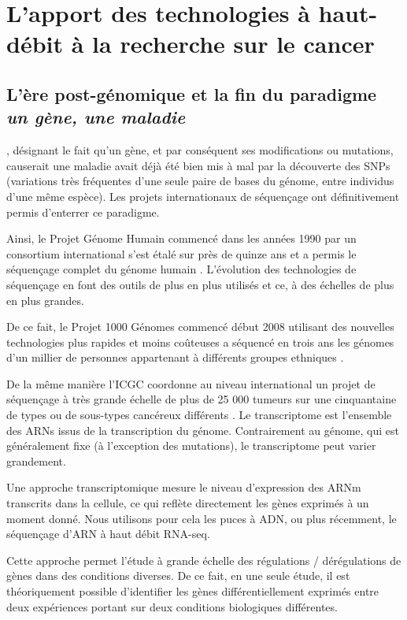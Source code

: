  \section{\textcolor{myred}{L'apport des technologies à haut-débit à la recherche sur le cancer}}

    \subsection{\textcolor{myred}{L'ère post-génomique et la fin du paradigme \emph{un gène, une maladie}}}
      , désignant le fait qu'un gène, et par conséquent ses modifications ou mutations, causerait une maladie avait déjà été bien mis à mal par la découverte des \acp{SNP} (variations très fréquentes d'une seule paire de bases du génome, entre individus d'une même espèce).
      Les projets internationaux de séquençage ont définitivement permis d'enterrer ce paradigme.

      Ainsi, le Projet Génome Humain commencé dans les années 1990 par un consortium international s'est étalé sur près de quinze ans et a permis le séquençage complet du génome humain \citep{HGP2001}.
      L'évolution des technologies de séquençage en font des outils de plus en plus utilisés et ce, à des échelles de plus en plus grandes.

      De ce fait, le Projet 1000 Génomes commencé début 2008 utilisant des nouvelles technologies plus rapides et moins coûteuses a séquencé en trois ans les génomes d'un millier de personnes appartenant à différents groupes ethniques \citep{1000GPC2010}.

      De la même manière l'\ac{ICGC} coordonne au niveau international un projet de séquençage à très grande échelle de plus de 25 000 tumeurs sur une cinquantaine de types ou de sous-types cancéreux différents \citep{ICGC2010}.
      Le transcriptome est l'ensemble des \acsp{ARN} issus de la transcription du génome.
      Contrairement au génome, qui est généralement fixe (à l'exception des mutations), le transcriptome peut varier grandement.

      Une approche transcriptomique mesure le niveau d'expression des \acs{ARNm} transcrits dans la cellule, ce qui reflète directement les gènes exprimés à un moment donné.
      Nous utilisons pour cela les puces à \acs{ADN}, ou plus récemment, le séquençage d'\acs{ARN} à haut débit \acs{RNA}-seq.

      Cette approche permet l'étude à grande échelle des régulations / dérégulations de gènes dans des conditions diverses.
      De ce fait, en une seule étude, il est théoriquement possible d'identifier les gènes différentiellement exprimés entre deux expériences portant sur deux conditions biologiques différentes.

